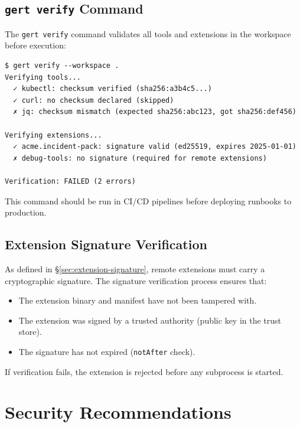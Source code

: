 \subsection{\texttt{gert verify} Command}

The \texttt{gert verify} command validates all tools and extensions in the
workspace before execution:

\begin{verbatim}
$ gert verify --workspace .
Verifying tools...
  ✓ kubectl: checksum verified (sha256:a3b4c5...)
  ✓ curl: no checksum declared (skipped)
  ✗ jq: checksum mismatch (expected sha256:abc123, got sha256:def456)

Verifying extensions...
  ✓ acme.incident-pack: signature valid (ed25519, expires 2025-01-01)
  ✗ debug-tools: no signature (required for remote extensions)

Verification: FAILED (2 errors)
\end{verbatim}

This command should be run in CI/CD pipelines before deploying runbooks to
production.

\subsection{Extension Signature Verification}

As defined in §\ref{sec:extension-signature}, remote extensions must carry a
cryptographic signature.  The signature verification process ensures that:

\begin{itemize}
  \item The extension binary and manifest have not been tampered with.
  \item The extension was signed by a trusted authority (public key in the
        trust store).
  \item The signature has not expired (\texttt{notAfter} check).
\end{itemize}

If verification fails, the extension is rejected before any subprocess is
started.

\section{Security Recommendations}


